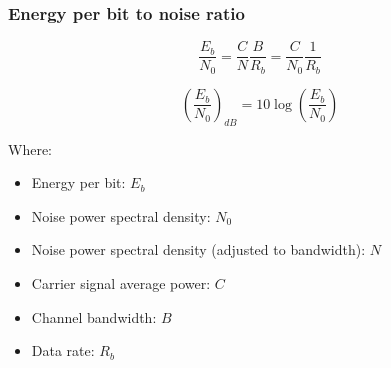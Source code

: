 \documentclass[../main.tex]{subfiles}
\begin{document}
\subsubsection{Energy per bit to noise ratio}

$$
	\frac {E_b} {N_0} = \frac {C} {N} \frac {B} {R_b} = \frac {C} {N_0} \frac {1} {R_b}
$$

$$
	\left( \frac {E_b} {N_0} \right)_{dB} = 10 \log \left( \frac {E_b} {N_0} \right)
$$

Where:

\begin{itemize}
	\item Energy per bit: $E_b$
	\item Noise power spectral density: $N_0$
	\item Noise power spectral density (adjusted to bandwidth): $N$
	\item Carrier signal average power: $C$
	\item Channel bandwidth: $B$
	\item Data rate: $R_b$
\end{itemize}
\end{document}
